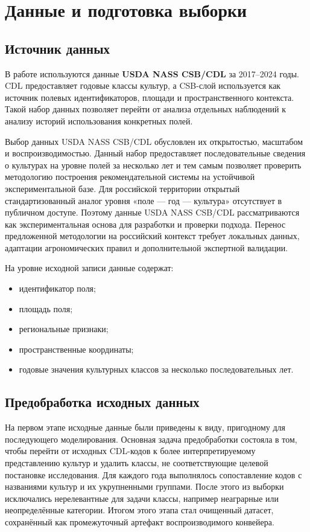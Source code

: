 \section{Данные и подготовка выборки}

\subsection{Источник данных}

В работе используются данные \textbf{USDA NASS CSB/CDL} за 2017--2024 годы. CDL предоставляет годовые классы культур, а
CSB-слой используется как источник полевых идентификаторов, площади и пространственного контекста. Такой набор данных
позволяет перейти от анализа отдельных наблюдений к анализу историй использования конкретных полей.

Выбор данных USDA NASS CSB/CDL обусловлен их открытостью, масштабом и воспроизводимостью. Данный набор предоставляет
последовательные сведения о культурах на уровне полей за несколько лет и тем самым позволяет проверить методологию
построения рекомендательной системы на устойчивой экспериментальной базе. Для российской территории открытый
стандартизованный аналог уровня «поле --- год --- культура» отсутствует в публичном доступе. Поэтому данные USDA NASS
CSB/CDL рассматриваются как экспериментальная основа для разработки и проверки подхода. Перенос предложенной
методологии на российский контекст требует локальных данных, адаптации агрономических правил и дополнительной
экспертной валидации.

На уровне исходной записи данные содержат:

\begin{itemize}
\tightlist
\item
  идентификатор поля;
\item
  площадь поля;
\item
  региональные признаки;
\item
  пространственные координаты;
\item
  годовые значения культурных классов за несколько последовательных лет.
\end{itemize}

\subsection{Предобработка исходных данных}

На первом этапе исходные данные были приведены к виду, пригодному для последующего моделирования. Основная задача
предобработки состояла в том, чтобы перейти от исходных CDL-кодов к более интерпретируемому представлению культур и
удалить классы, не соответствующие целевой постановке исследования. Для каждого года выполнялось сопоставление кодов с
названиями культур и их укрупненными группами. После этого из выборки исключались нерелевантные для задачи классы,
например неаграрные или неопределённые категории. Итогом этого этапа стал очищенный датасет, сохранённый как
промежуточный артефакт воспроизводимого конвейера.

